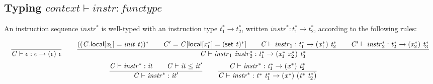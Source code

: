 \documentclass[a4paper]{scrartcl}
\begin{document}
\subsection*{Typing $\boxed{{\mathit{context}} \vdash {\mathit{instr}} : {\mathit{functype}}}$}

An instruction sequence ${{\mathit{instr}}^\ast}$ is well-typed with an instruction type ${{\mathit{t}}_{{1}}^\ast} \rightarrow {{\mathit{t}}_{{2}}^\ast}$, written ${{\mathit{instr}}^\ast} : {{\mathit{t}}_{{1}}^\ast} \rightarrow {{\mathit{t}}_{{2}}^\ast}$, according to the following rules:

$$
\begin{array}{@{}c@{}}\displaystyle
\frac{
}{
{\mathit{C}} \vdash \epsilon : \epsilon \rightarrow (\epsilon)~\epsilon
}
\qquad
\frac{
(({\mathit{C}}.\mathsf{local}[{\mathit{x}}_{{1}}] = {\mathit{init}}~{\mathit{t}}))^\ast
 \qquad
{\mathit{C}'} = {\mathit{C}}[\mathsf{local}[{{\mathit{x}}_{{1}}^\ast}] = {(\mathsf{set}~{\mathit{t}})^\ast}]
 \qquad
{\mathit{C}} \vdash {\mathit{instr}}_{{1}} : {{\mathit{t}}_{{1}}^\ast} \rightarrow ({{\mathit{x}}_{{1}}^\ast})~{{\mathit{t}}_{{2}}^\ast}
 \qquad
{\mathit{C}'} \vdash {{\mathit{instr}}_{{2}}^\ast} : {{\mathit{t}}_{{2}}^\ast} \rightarrow ({{\mathit{x}}_{{2}}^\ast})~{{\mathit{t}}_{{3}}^\ast}
}{
{\mathit{C}} \vdash {\mathit{instr}}_{{1}}~{{\mathit{instr}}_{{2}}^\ast} : {{\mathit{t}}_{{1}}^\ast} \rightarrow ({{\mathit{x}}_{{1}}^\ast}~{{\mathit{x}}_{{2}}^\ast})~{{\mathit{t}}_{{3}}^\ast}
}
\\[3ex]\displaystyle
\frac{
{\mathit{C}} \vdash {{\mathit{instr}}^\ast} : {\mathit{it}}
 \qquad
{\mathit{C}} \vdash {\mathit{it}} \leq {\mathit{it}'}
}{
{\mathit{C}} \vdash {{\mathit{instr}}^\ast} : {\mathit{it}'}
}
\qquad
\frac{
{\mathit{C}} \vdash {{\mathit{instr}}^\ast} : {{\mathit{t}}_{{1}}^\ast} \rightarrow ({{\mathit{x}}^\ast})~{{\mathit{t}}_{{2}}^\ast}
}{
{\mathit{C}} \vdash {{\mathit{instr}}^\ast} : {{\mathit{t}}^\ast}~{{\mathit{t}}_{{1}}^\ast} \rightarrow ({{\mathit{x}}^\ast})~({{\mathit{t}}^\ast}~{{\mathit{t}}_{{2}}^\ast})
}
\qquad
\end{array}
$$
\end{document}
